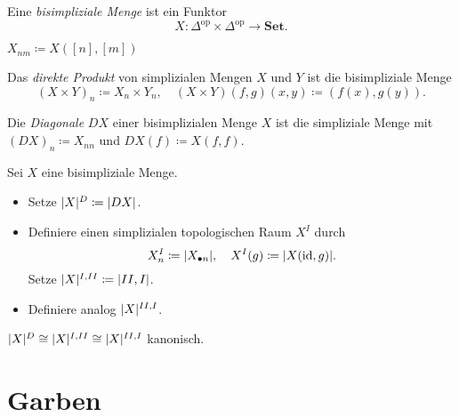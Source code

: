 \documentclass{cheat-sheet}
\newcommand{\SetC}{\mathbf{Set}} %
\newcommand{\op}{\mathrm{op}} %
\begin{document}
\begin{defn}
  Eine \emph{bisimpliziale Menge} ist ein Funktor
  \[ X : \Delta^\op \times \Delta^\op \to \SetC. \]
\end{defn}

\begin{nota}
  $X_{nm} \coloneqq X([n],[m])$
\end{nota}

\begin{bsp}
  Das \emph{direkte Produkt} von simplizialen Mengen $X$ und $Y$ ist die bisimpliziale Menge
  \[
    (X \times Y)_n \coloneqq X_n \times Y_n, \quad
    (X \times Y)(f, g)(x, y) \coloneqq (f(x), g(y)).
  \]
\end{bsp}

\begin{samepage}

\begin{defn}
  Die \emph{Diagonale} $DX$ einer bisimplizialen Menge $X$ ist die simpliziale Menge mit
  $(DX)_n \coloneqq X_{nn}$ und $DX(f) \coloneqq X(f, f)$.
\end{defn}

\begin{defn}
  Sei $X$ eine bisimpliziale Menge.
  \begin{itemize}
    \item Setze $\lvert X\rvert^D \coloneqq \lvert DX\rvert$.
    \item Definiere einen simplizialen topologischen Raum $X^I$ durch
    \[ X^I_n \coloneqq \lvert X_{\bullet n}\rvert, \quad X^I(g) \coloneqq \lvert X(\operatorname{id}, g)\rvert. \]
    Setze $\lvert X\rvert^{I,II} \coloneqq \lvert II,I\rvert$.
    \item Definiere analog $\lvert X\rvert^{II,I}$.
  \end{itemize}
\end{defn}

\begin{satz}
  $\lvert X\rvert^D \cong \lvert X\rvert^{I,II} \cong \lvert X\rvert^{II,I}$ kanonisch.
\end{satz}

\section{Garben}

\end{samepage}


\end{document}

